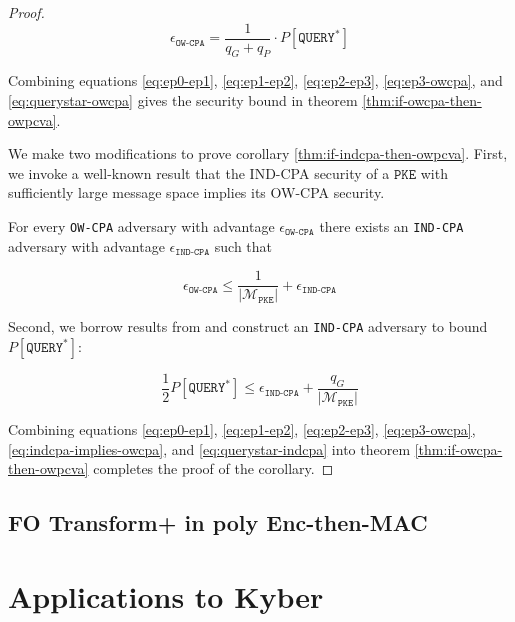 \documentclass[floatrow,journal=tches,submission]{iacrtrans}
\newcommand{\monospace}{\texttt}
\newcommand{\pke}{\monospace{PKE}}
\newcommand{\norm}[1]{\left\lvert #1 \right\rvert}
\begin{document}
\begin{proof}
    \begin{equation}\label{eq:querystar-owcpa}
        \epsilon_\monospace{OW-CPA} = \frac{1}{q_G + q_P} \cdot P[\monospace{QUERY}^\ast]
    \end{equation}

    Combining equations \ref{eq:ep0-ep1}, \ref{eq:ep1-ep2}, \ref{eq:ep2-ep3}, \ref{eq:ep3-owcpa}, and \ref{eq:querystar-owcpa} gives the security bound in theorem \ref{thm:if-owcpa-then-owpcva}.

    We make two modifications to prove corollary \ref{thm:if-indcpa-then-owpcva}. First, we invoke a well-known result that the IND-CPA security of a $\pke$ with sufficiently large message space implies its OW-CPA security.

    \begin{lemma}
        For every \monospace{OW-CPA} adversary with advantage $\epsilon_\monospace{OW-CPA}$ there exists an \monospace{IND-CPA} adversary with advantage $\epsilon_\monospace{IND-CPA}$ such that

        \begin{equation}\label{eq:indcpa-implies-owcpa}
            \epsilon_\monospace{OW-CPA} \leq \frac{1}{\norm{\mathcal{M}_\pke}} + \epsilon_\monospace{IND-CPA}
        \end{equation}
    \end{lemma}

    Second, we borrow results from \cite{hofheinz2017modular} and construct an \monospace{IND-CPA} adversary to bound $P[\monospace{QUERY}^\ast]$:

    \begin{equation}\label{eq:querystar-indcpa}
        \frac{1}{2}P[\monospace{QUERY}^\ast] 
        \leq \epsilon_\monospace{IND-CPA} + \frac{q_G}{\norm{\mathcal{M}_\pke}}
    \end{equation}

    Combining equations \ref{eq:ep0-ep1}, \ref{eq:ep1-ep2}, \ref{eq:ep2-ep3}, \ref{eq:ep3-owcpa}, \ref{eq:indcpa-implies-owcpa}, and \ref{eq:querystar-indcpa} into theorem \ref{thm:if-owcpa-then-owpcva} completes the proof of the corollary.
\end{proof}

\subsection{FO Transform+ in poly Enc-then-MAC}


\section{Applications to Kyber}
\end{document}
